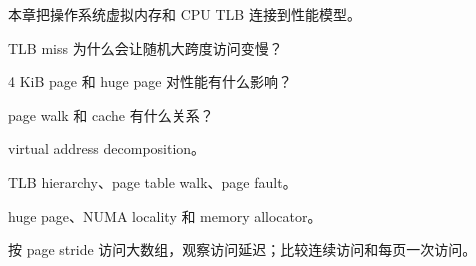 {本章把操作系统虚拟内存和 CPU TLB 连接到性能模型。}
{\item TLB miss 为什么会让随机大跨度访问变慢？
\item 4 KiB page 和 huge page 对性能有什么影响？
\item page walk 和 cache 有什么关系？}
{\item virtual address decomposition。
\item TLB hierarchy、page table walk、page fault。
\item huge page、NUMA locality 和 memory allocator。}
{按 page stride 访问大数组，观察访问延迟；比较连续访问和每页一次访问。}
